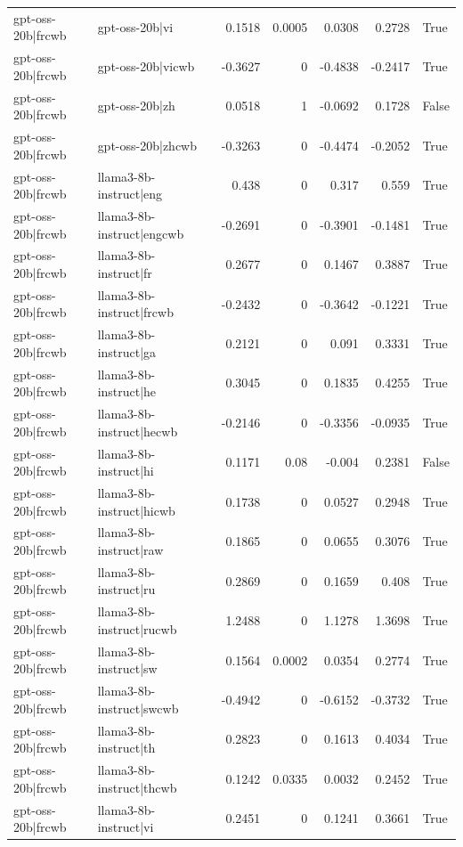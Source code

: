 \begin{table}
\begin{tabular}{l l r r r r l}
gpt-oss-20b|frcwb & gpt-oss-20b|vi & 0.1518 & 0.0005 & 0.0308 & 0.2728 & True \\
gpt-oss-20b|frcwb & gpt-oss-20b|vicwb & -0.3627 & 0 & -0.4838 & -0.2417 & True \\
gpt-oss-20b|frcwb & gpt-oss-20b|zh & 0.0518 & 1 & -0.0692 & 0.1728 & False \\
gpt-oss-20b|frcwb & gpt-oss-20b|zhcwb & -0.3263 & 0 & -0.4474 & -0.2052 & True \\
gpt-oss-20b|frcwb & llama3-8b-instruct|eng & 0.438 & 0 & 0.317 & 0.559 & True \\
gpt-oss-20b|frcwb & llama3-8b-instruct|engcwb & -0.2691 & 0 & -0.3901 & -0.1481 & True \\
gpt-oss-20b|frcwb & llama3-8b-instruct|fr & 0.2677 & 0 & 0.1467 & 0.3887 & True \\
gpt-oss-20b|frcwb & llama3-8b-instruct|frcwb & -0.2432 & 0 & -0.3642 & -0.1221 & True \\
gpt-oss-20b|frcwb & llama3-8b-instruct|ga & 0.2121 & 0 & 0.091 & 0.3331 & True \\
gpt-oss-20b|frcwb & llama3-8b-instruct|he & 0.3045 & 0 & 0.1835 & 0.4255 & True \\
gpt-oss-20b|frcwb & llama3-8b-instruct|hecwb & -0.2146 & 0 & -0.3356 & -0.0935 & True \\
gpt-oss-20b|frcwb & llama3-8b-instruct|hi & 0.1171 & 0.08 & -0.004 & 0.2381 & False \\
gpt-oss-20b|frcwb & llama3-8b-instruct|hicwb & 0.1738 & 0 & 0.0527 & 0.2948 & True \\
gpt-oss-20b|frcwb & llama3-8b-instruct|raw & 0.1865 & 0 & 0.0655 & 0.3076 & True \\
gpt-oss-20b|frcwb & llama3-8b-instruct|ru & 0.2869 & 0 & 0.1659 & 0.408 & True \\
gpt-oss-20b|frcwb & llama3-8b-instruct|rucwb & 1.2488 & 0 & 1.1278 & 1.3698 & True \\
gpt-oss-20b|frcwb & llama3-8b-instruct|sw & 0.1564 & 0.0002 & 0.0354 & 0.2774 & True \\
gpt-oss-20b|frcwb & llama3-8b-instruct|swcwb & -0.4942 & 0 & -0.6152 & -0.3732 & True \\
gpt-oss-20b|frcwb & llama3-8b-instruct|th & 0.2823 & 0 & 0.1613 & 0.4034 & True \\
gpt-oss-20b|frcwb & llama3-8b-instruct|thcwb & 0.1242 & 0.0335 & 0.0032 & 0.2452 & True \\
gpt-oss-20b|frcwb & llama3-8b-instruct|vi & 0.2451 & 0 & 0.1241 & 0.3661 & True \\

\end{tabular}
\end{table}
